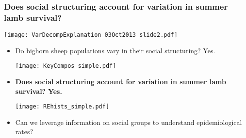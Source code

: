 \documentclass[fleqn,xcolor=table]{beamer}
\begin{document}
\begin{frame}[t]
	\frametitle{\color{darkred} Does social structuring account for
	variation in summer lamb survival?}
	\vspace{.2in}

	\texttt{[image: VarDecompExplanation\_03Oct2013\_slide2.pdf]}
\end{frame}


{
\begin{frame}[t]
	\begin{itemize}
		\item[] \footnotesize \color{navy} Do bighorn sheep populations vary in their social
			structuring?
			\color{darkred} Yes.

			\texttt{[image: KeyCompos\_simple.pdf]}
			\vspace{.1in}
		\item[] \footnotesize \color{navy} \textbf{Does social structuring account for variation in
			summer lamb survival?}
			\color{darkred} \textbf{Yes.}

			\texttt{[image: REhists\_simple.pdf]}
			\vspace{.1in}
		\item[] \footnotesize \color{navy} Can we leverage information on social groups to 
			understand epidemiological rates?
	\end{itemize}
\end{frame}
}
%
%
%
%
\end{document}

